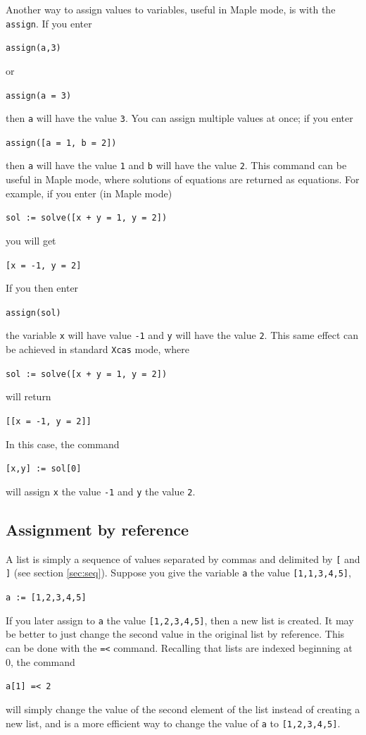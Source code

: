 \documentclass[a4paper,11pt]{book}
\begin{document}
Another way to assign values to variables, useful in Maple mode, is
with the \texttt{assign}. If you enter
\begin{center}
  {\tt assign(a,3)}
\end{center}
or
\begin{center}
  {\tt assign(a = 3)}
\end{center}
then \texttt{a} will have the value \texttt{3}.  You can assign
multiple values at once; if you enter
\begin{center}
  {\tt assign([a = 1, b = 2])}
\end{center}
then \texttt{a} will have the value \texttt{1} and \texttt{b} will
have the value \texttt{2}.  This command can be useful in Maple mode,
where solutions of equations are returned as equations.  For example,
if you enter (in Maple mode)
\begin{center}
  {\tt sol := solve([x + y = 1, y = 2])}
\end{center}
you will get
\begin{center}
  {\tt [x = -1, y = 2]}
\end{center}
If you then enter
\begin{center}
  {\tt assign(sol)}
\end{center}
the variable \texttt{x} will have value \texttt{-1} and \texttt{y}
will have the value \texttt{2}.  This same effect can be achieved in
standard \texttt{Xcas} mode, where
\begin{center}
  {\tt sol := solve([x + y = 1, y = 2])}
\end{center}
will return
\begin{center}
  {\tt [[x = -1, y = 2]]}
\end{center}
In this case, the command
\begin{center}
  {\tt [x,y] := sol[0]}
\end{center}
will assign \texttt{x} the value \texttt{-1} and \texttt{y} the value
\texttt{2}.

\subsection{Assignment by reference}
\label{subsec:refassign}
A list is simply a sequence of values separated by commas and
delimited by \texttt{[} and \texttt{]} (see section \ref{sec:seq}).
Suppose you give the variable \texttt{a} the value \texttt{[1,1,3,4,5]},
\begin{center}
 {\tt  a := [1,2,3,4,5]}
\end{center}
If you later assign to \texttt{a} the value \texttt{[1,2,3,4,5]}, then
a new list is created.  It may be better to just change the second
value in the original list by reference.  This can be done with the
\texttt{=<} command.  Recalling that lists are indexed beginning at 0,
the command
\begin{center}
  {\tt a[1] =< 2}
\end{center}
will simply change the value of the second element of the list instead
of creating a new list, and is a more efficient way to change the
value of \texttt{a} to \texttt{[1,2,3,4,5]}. 
\end{document}

